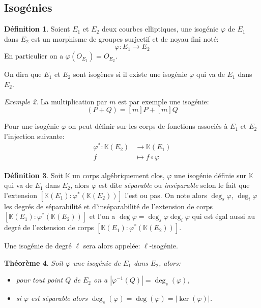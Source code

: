 \documentclass[10pt,a4paper]{book}
\theoremstyle{plain}
\newtheorem{thm}{Théorème}[chapter]
\theoremstyle{definition}
\theoremstyle{definition}
\theoremstyle{definition}
\theoremstyle{definition}
\newtheorem{defi}[thm]{Définition}
\theoremstyle{remark}
\theoremstyle{remark}
\newtheorem{exe}[thm]{Exemple}
\theoremstyle{definition}
\begin{document}
\subsection{Isogénies}

\begin{defi}
Soient $E_1$ et $E_2$ deux courbes elliptiques, une isogénie $\varphi$ de $E_1$ dans $E_2$ est un morphisme de groupes surjectif et de noyau fini noté:
\begin{equation*}
\varphi:E_1 \rightarrow E_2
\end{equation*}
En particulier on a $\varphi(O_{E_1})=O_{E_2}$.
\end{defi}
On dira que $E_1$ et $E_2$ sont isogènes si il existe une isogénie $\varphi$ qui va de $E_1$ dans $E_2$. 

\begin{exe}
La multiplication par $m$ est par exemple une isogénie:
\begin{equation*}
[m](P+Q)=[m]P+[m]Q
\end{equation*}
\end{exe}

Pour une isogénie $\varphi$ on peut définir sur les corps de fonctions associés à $E_1$ et $E_2$ l'injection suivante:
\begin{equation*}
\begin{alignedat}{1}
\varphi^*: \mathbb{K}(E_2) & \rightarrow \mathbb{K}(E_1) \\
f & \mapsto f  \circ \varphi
\end{alignedat}
\end{equation*}

\begin{defi}
Soit $\mathbb{K}$ un corps algébriquement clos, $\varphi$ une isogénie définie sur $\mathbb{K}$ qui va de $E_1$ dans $E_2$, alors $\varphi$ est dite \emph{séparable} ou \emph{inséparable} selon le fait que l'extension $[\mathbb{K}(E_1):\varphi^*(\mathbb{K}(E_2))]$ l'est ou pas. On note alors \emph{$\deg_s{\varphi}$}, \emph{$\deg_i{\varphi}$} les degrés de séparabilité et d'inséparabilité de l'extension de corps $[\mathbb{K}(E_1):\varphi^*(\mathbb{K}(E_2))]$ et l'on a $\deg{\varphi}=\deg_s{\varphi}\deg_i{\varphi}$ qui est égal aussi au degré de l'extension de corps $[\mathbb{K}(E_1):\varphi^*(\mathbb{K}(E_2))]$.
\end{defi}


Une isogénie de degré $\ell$ sera alors appelée: $\ell$-isogénie.

\begin{thm}
Soit $\varphi$ une isogénie de $E_1$ dans $E_2$, alors:
\begin{itemize}
\item pour tout point $Q$ de $E_2$ on a $|\varphi^{-1}(Q)|=\deg_s(\varphi)$,
\item si $\varphi$ est séparable alors $\deg_s(\varphi)=\deg(\varphi)=|\ker(\varphi)|$.
\end{itemize}
\end{thm}
\end{document}
